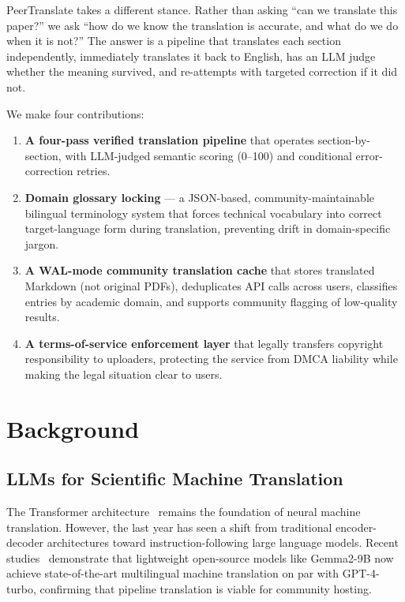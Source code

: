 \documentclass{article}
\begin{document}
PeerTranslate takes a different stance. Rather than asking ``can we translate this paper?'' we ask ``how do we know the translation is accurate, and what do we do when it is not?'' The answer is a pipeline that translates each section independently, immediately translates it back to English, has an LLM judge whether the meaning survived, and re-attempts with targeted correction if it did not.

We make four contributions:
\begin{enumerate}
    \item \textbf{A four-pass verified translation pipeline} that operates section-by-section, with LLM-judged semantic scoring (0--100) and conditional error-correction retries.
    \item \textbf{Domain glossary locking} --- a JSON-based, community-maintainable bilingual terminology system that forces technical vocabulary into correct target-language form during translation, preventing drift in domain-specific jargon.
    \item \textbf{A WAL-mode community translation cache} that stores translated Markdown (not original PDFs), deduplicates API calls across users, classifies entries by academic domain, and supports community flagging of low-quality results.
    \item \textbf{A terms-of-service enforcement layer} that legally transfers copyright responsibility to uploaders, protecting the service from DMCA liability while making the legal situation clear to users.
\end{enumerate}

\section{Background}

\subsection{LLMs for Scientific Machine Translation}

The Transformer architecture~\cite{vaswani2017attention} remains the foundation of neural machine translation. However, the last year has seen a shift from traditional encoder-decoder architectures toward instruction-following large language models. Recent studies~\cite{zhang2025multilingual} demonstrate that lightweight open-source models like Gemma2-9B now achieve state-of-the-art multilingual machine translation on par with GPT-4-turbo, confirming that pipeline translation is viable for community hosting. 
\end{document}
